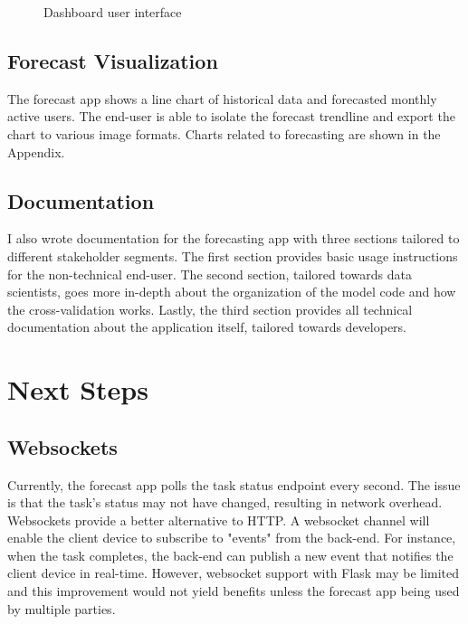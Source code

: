 \documentclass[11pt, oneside]{article}
\begin{document}
\begin{figure}[h]
  \caption{Dashboard user interface}
  \centering
  \label{fig:Dashboard}
\end{figure}

\subsection{Forecast Visualization}
The forecast app shows a line chart of historical data and forecasted monthly active users. The end-user is able to isolate the forecast trendline and export the chart to various image formats. Charts related to forecasting are shown in the Appendix.

\subsection{Documentation}
I also wrote documentation for the forecasting app with three sections tailored to different stakeholder segments. The first section provides basic usage instructions for the non-technical end-user. The second section, tailored towards data scientists, goes more in-depth about the organization of the model code and how the cross-validation works. Lastly, the third section provides all technical documentation about the application itself, tailored towards developers.

\section{Next Steps}
\subsection{Websockets}
Currently, the forecast app polls the task status endpoint every second. The issue is that the task's status may not have changed, resulting in network overhead. Websockets provide a better alternative to HTTP. A websocket channel will enable the client device to subscribe to "events" from the back-end. For instance, when the task completes, the back-end can publish a new event that notifies the client device in real-time. However, websocket support with Flask may be limited and this improvement would not yield benefits unless the forecast app being used by multiple parties.
\end{document}
